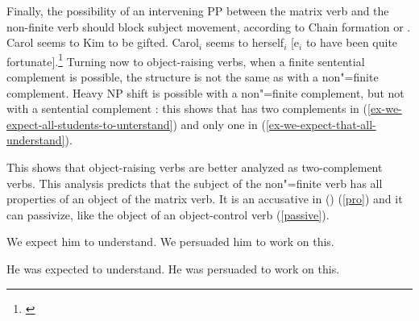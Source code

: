 Finally, the possibility of an intervening PP between the matrix verb and the non-finite verb should
block subject movement, according to Chain formation or 
\citep{Rizzi1986,Rizzi1990b-u}.
\eal
\ex Carol seems to Kim to be gifted.
\ex Carol$_i$ seems to herself$_i$ [e$_i$ to have been quite fortunate].\footnote{
\citet[]{McGinnis2004a-u}
}
\zl
Turning now to object-raising verbs, when a finite sentential complement is possible, the structure
is not the same as  with a non"=finite complement. Heavy NP shift is possible with a non"=finite
complement, but not with a sentential complement \parencites[]{Bresnan1982}[]{PollardandSag1994}: this shows that  has two complements in (\ref{ex-we-expect-all-students-to-unterstand}) and only one in (\ref{ex-we-expect-that-all-understand}).

\eal
{}
\zl



\noindent
This shows that object-raising verbs are better analyzed as two-complement verbs. This analysis predicts that the subject of the non"=finite verb has all properties of an object of the matrix verb. It is an accusative in  () (\ref{pro}) and it can passivize, like the object of an object-control verb (\ref{passive}).

\begin{exe}
\ex
\begin{xlist} \label{pro}
\ex We expect him to understand.
\ex  We persuaded him to work on this.
\end{xlist}
\ex \begin{xlist} \label{passive}
\ex  He was expected to understand.
\ex  He was persuaded to work on this.
\end{xlist}
	
\end{exe}



